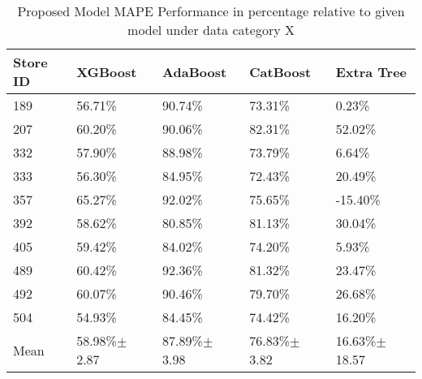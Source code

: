 \begin{table*}[]
\centering
\caption{Proposed Model MAPE Performance in percentage relative to given model under data category X}
\setlength{\tabcolsep}{3pt}
 {\renewcommand{\arraystretch}{1}%
\label{tab:my-table}
\begin{tabular}{p{}p{}p{}p{}p{}}
\hline
\textbf{Store ID} & \textbf{XGBoost}  & \textbf{AdaBoost}  & \textbf{CatBoost}  & \textbf{Extra Tree } \\ \hline
189        & 56.71\%         & 90.74\%           & 73.31\%          & 0.23\%             \\
207        & 60.20\%         & 90.06\%          & 82.31\%           & 52.02\%            \\
332        & 57.90\%         & 88.98\%           & 73.79\%          & 6.64\%             \\
333        & 56.30\%          & 84.95\%          & 72.43\%           & 20.49\%            \\
357        & 65.27\%         & 92.02\%          & 75.65\%         & -15.40\%           \\
392        & 58.62\%         & 80.85\%          & 81.13\%          & 30.04\%            \\
405        & 59.42\%        & 84.02\%           & 74.20\%          & 5.93\%             \\
489        & 60.42\%         & 92.36\%           & 81.32\%          & 23.47\%            \\
492        & 60.07\%         & 90.46\%         & 79.70\%         & 26.68\%              \\
504        & 54.93\%         & 84.45\%          & 74.42\%          & 16.20\%            \\ \hline
Mean           & 58.98\%$\pm$ 2.87  & 87.89\%$\pm$ 3.98   & 76.83\%$\pm$ 3.82   & 16.63\%$\pm$ 18.57     \\ \hline
\end{tabular}%
}
\end{table*}

